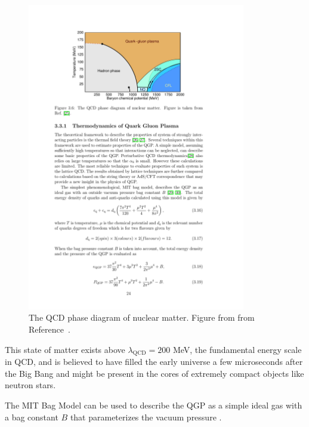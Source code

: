\begin{figure}[htbp]
\begin{center}
\includegraphics[width=0.85\textwidth]{figures/theory/qcd_phase}
\caption{The QCD phase diagram of nuclear matter. Figure from from Reference~\cite{PhysRevD.72.034004}. }
\label{fig:qcd_phase}
\end{center}
\end{figure}

This state of matter exists above $\lambda_{\mathrm{QCD}} = 200$ MeV, the fundamental energy scale in QCD, and is believed to have filled the early universe a few microseconds after the Big Bang \cite{23, 24} and might be present in the cores of extremely compact objects like neutron stars. 

The MIT Bag Model can be used to describe the QGP as a simple ideal gas with a bag constant $B$ that parameterizes the vacuum pressure \cite{Muller1993, Yagi:2005yb}.

